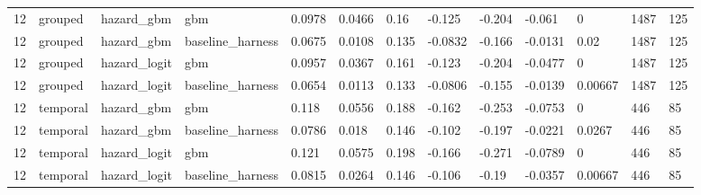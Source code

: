 \begin{tabular}{lllllllllllll}
12 & grouped & hazard\_gbm & gbm & 0.0978 & 0.0466 & 0.16 & -0.125 & -0.204 & -0.061 & 0 & 1487 & 125 \\
12 & grouped & hazard\_gbm & baseline\_harness & 0.0675 & 0.0108 & 0.135 & -0.0832 & -0.166 & -0.0131 & 0.02 & 1487 & 125 \\
12 & grouped & hazard\_logit & gbm & 0.0957 & 0.0367 & 0.161 & -0.123 & -0.204 & -0.0477 & 0 & 1487 & 125 \\
12 & grouped & hazard\_logit & baseline\_harness & 0.0654 & 0.0113 & 0.133 & -0.0806 & -0.155 & -0.0139 & 0.00667 & 1487 & 125 \\
12 & temporal & hazard\_gbm & gbm & 0.118 & 0.0556 & 0.188 & -0.162 & -0.253 & -0.0753 & 0 & 446 & 85 \\
12 & temporal & hazard\_gbm & baseline\_harness & 0.0786 & 0.018 & 0.146 & -0.102 & -0.197 & -0.0221 & 0.0267 & 446 & 85 \\
12 & temporal & hazard\_logit & gbm & 0.121 & 0.0575 & 0.198 & -0.166 & -0.271 & -0.0789 & 0 & 446 & 85 \\
12 & temporal & hazard\_logit & baseline\_harness & 0.0815 & 0.0264 & 0.146 & -0.106 & -0.19 & -0.0357 & 0.00667 & 446 & 85 \\
\bottomrule
\end{tabular}